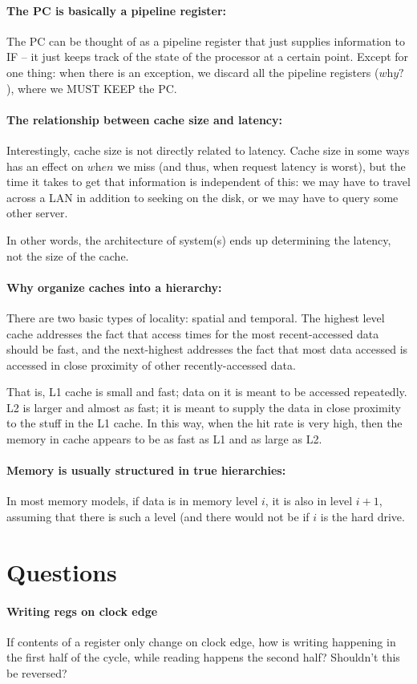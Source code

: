 \documentclass[a4paper]{article}
\begin{document}
\paragraph{The PC is basically a pipeline register: } The PC can be thought of as a pipeline register that just supplies information to IF -- it just keeps track of the state of the processor at a certain point. Except for one thing: when there is an exception, we discard all the pipeline registers ($\textit{why?}$), where we MUST KEEP the PC.

\paragraph{The relationship between cache size and latency: } Interestingly, cache size is not directly related to latency. Cache size in some ways has an effect on $\textit{when}$ we miss (and thus, when request latency is worst), but the time it takes to get that information is independent of this: we may have to travel across a LAN in addition to seeking on the disk, or we may have to query some other server.

In other words, the architecture of system(s) ends up determining the latency, not the size of the cache.

\paragraph{Why organize caches into a hierarchy: } There are two basic types of locality: spatial and temporal. The highest level cache addresses the fact that access times for the most recent-accessed data should be fast, and the next-highest addresses the fact that most data accessed is accessed in close proximity of other recently-accessed data.

That is, L1 cache is small and fast; data on it is meant to be accessed repeatedly. L2 is larger and almost as fast; it is meant to supply the data in close proximity to the stuff in the L1 cache. In this way, when the hit rate is very high, then the memory in cache appears to be as fast as L1 and as large as L2.

\paragraph{Memory is usually structured in true hierarchies: } In most memory models, if data is in memory level $i$, it is also in level $i+1$, assuming that there is such a level (and there would not be if $i$ is the hard drive.

\section*{Questions}

\paragraph{Writing regs on clock edge} If contents of a register only change on clock edge, how is writing happening in the first half of the cycle, while reading happens the second half? Shouldn't this be reversed?
\end{document}
